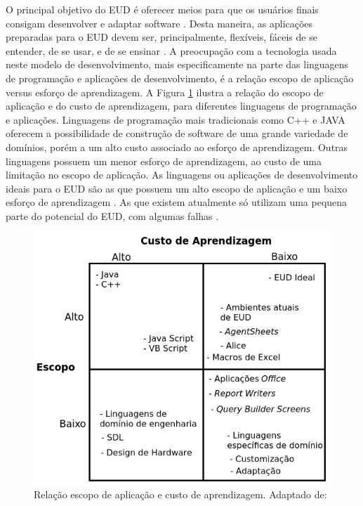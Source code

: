 O principal objetivo do EUD é oferecer meios para que os usuários finais consigam desenvolver e adaptar software \cite{lieberman2006}. Desta maneira, as aplicações preparadas para o EUD devem ser, principalmente, flexíveis, fáceis de se entender, de se usar, e de se ensinar \cite{lieberman2006}. A preocupação com a tecnologia usada neste modelo de desenvolvimento, mais especificamente na parte das linguagens de programação e aplicações de desenvolvimento, é a relação escopo de aplicação versus esforço de aprendizagem. A Figura \ref{aplicacao_custo_aprendizagem} ilustra a relação do escopo de aplicação e do custo de aprendizagem, para diferentes linguagens de programação e aplicações. Linguagens de programação mais tradicionais como C++ e JAVA oferecem a possibilidade de construção de software de uma grande variedade de domínios, porém a um alto custo associado ao esforço de aprendizagem. Outras linguagens possuem um menor esforço de aprendizagem, ao custo de uma limitação no escopo de aplicação. As linguagens ou aplicações de desenvolvimento ideais para o EUD são as que possuem um alto escopo de aplicação e um baixo esforço de aprendizagem \cite{fischer2004}. As que existem atualmente só utilizam uma pequena parte do potencial do EUD, com algumas falhas \cite{paterno2013}.

\begin{figure}[h]
	\centering
		\includegraphics[scale=0.8]{figuras/trade_off_eud_editado}
	\caption{Relação escopo de aplicação e custo de aprendizagem. Adaptado de: \cite{fischer2004}}
	\label{aplicacao_custo_aprendizagem}
\end{figure}
\pagebreak

